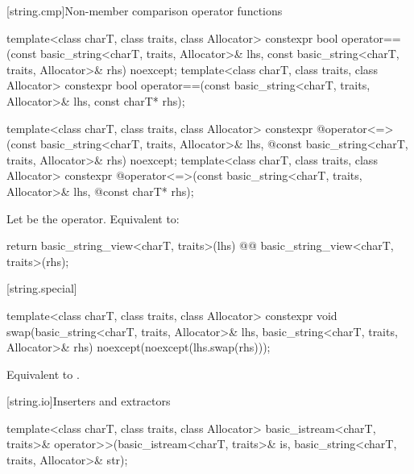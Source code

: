 [string.cmp]{Non-member comparison operator functions}
\begin{itemdecl}
template<class charT, class traits, class Allocator>
  constexpr bool
    operator==(const basic_string<charT, traits, Allocator>& lhs,
               const basic_string<charT, traits, Allocator>& rhs) noexcept;
template<class charT, class traits, class Allocator>
  constexpr bool operator==(const basic_string<charT, traits, Allocator>& lhs,
                            const charT* rhs);

template<class charT, class traits, class Allocator>
  constexpr @\seebelow@ operator<=>(const basic_string<charT, traits, Allocator>& lhs,
            @\itcorr@                      const basic_string<charT, traits, Allocator>& rhs) noexcept;
template<class charT, class traits, class Allocator>
  constexpr @\seebelow@ operator<=>(const basic_string<charT, traits, Allocator>& lhs,
            @\itcorr@                      const charT* rhs);
\end{itemdecl}
\begin{itemdescr}
\pnum
\effects
Let  be the operator.
Equivalent to:
\begin{codeblock}
return basic_string_view<charT, traits>(lhs) @@ basic_string_view<charT, traits>(rhs);
\end{codeblock}
\end{itemdescr}

[string.special]{}

%
\begin{itemdecl}
template<class charT, class traits, class Allocator>
  constexpr void
    swap(basic_string<charT, traits, Allocator>& lhs,
         basic_string<charT, traits, Allocator>& rhs)
      noexcept(noexcept(lhs.swap(rhs)));
\end{itemdecl}

\begin{itemdescr}
\pnum
\effects
Equivalent to .
\end{itemdescr}

[string.io]{Inserters and extractors}

%
\begin{itemdecl}
template<class charT, class traits, class Allocator>
  basic_istream<charT, traits>&
    operator>>(basic_istream<charT, traits>& is, basic_string<charT, traits, Allocator>& str);
\end{itemdecl}

